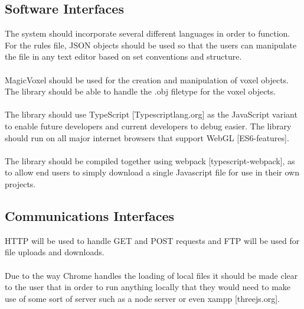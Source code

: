 \documentclass[english]{article}
\begin{document}
		\subsection{Software Interfaces}
		The system should incorporate several different languages in order to function. For the rules file, JSON objects should be 
		used so that the users can manipulate the file in any text editor based on set conventions and structure. 
		\\\\
		MagicVoxel should be used for the creation and manipulation of voxel objects. The library should be able to handle the .obj filetype for the voxel objects.
		\\\\
	 	The library should use TypeScript [Typescriptlang.org] as the JavaScript variant to enable future developers and current developers to debug easier. The library should run on all major internet browsers that support WebGL [ES6-features].
	 	\\\\
	 	The library should be compiled together using webpack [typescript-webpack], as to allow end users to simply download a single Javascript file for use in their own projects.
		
		\subsection{Communications Interfaces}
		HTTP will be used to handle GET and POST requests and FTP will be used for file uploads and downloads.
		\\\\
		Due to the way Chrome handles the loading of local files it should be made clear to the user that in order to run anything locally that they would need to make use of some sort of server such as a node server or even xampp [threejs.org].
	\pagebreak
	
	
	
\end{document}
